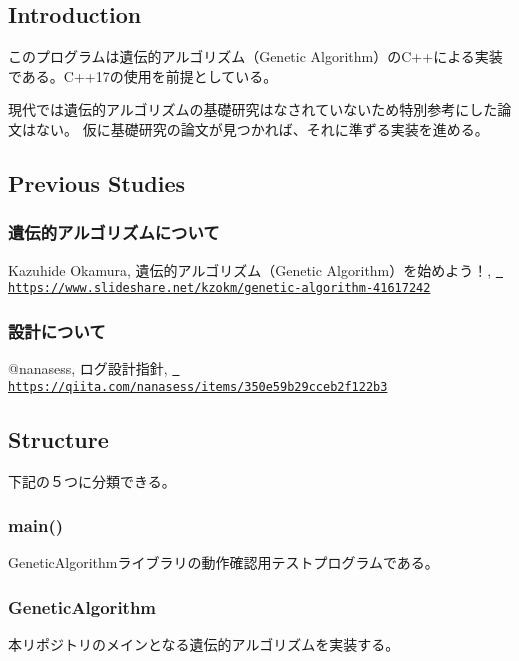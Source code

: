 \subsection*{Introduction}

このプログラムは遺伝的アルゴリズム（\+Genetic Algorithm）の\+C++による実装である。\+C++17の使用を前提としている。

現代では遺伝的アルゴリズムの基礎研究はなされていないため特別参考にした論文はない。 仮に基礎研究の論文が見つかれば、それに準ずる実装を進める。

\subsection*{Previous Studies}

\subsubsection*{遺伝的アルゴリズムについて}

Kazuhide Okamura, 遺伝的アルゴリズム（\+Genetic Algorithm）を始めよう！, \href{https://www.slideshare.net/kzokm/genetic-algorithm-41617242}{\texttt{ https\+://www.\+slideshare.\+net/kzokm/genetic-\/algorithm-\/41617242}}

\subsubsection*{設計について}

@nanasess, ログ設計指針, \href{https://qiita.com/nanasess/items/350e59b29cceb2f122b3}{\texttt{ https\+://qiita.\+com/nanasess/items/350e59b29cceb2f122b3}} \subsection*{Structure}

下記の５つに分類できる。

\subsubsection*{main()}

Genetic\+Algorithmライブラリの動作確認用テストプログラムである。

\subsubsection*{Genetic\+Algorithm}

本リポジトリのメインとなる遺伝的アルゴリズムを実装する。

